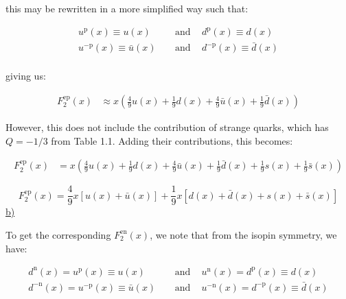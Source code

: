 \documentclass[11pt]{article}
\theoremstyle{definition}
\begin{document}
this may be rewritten in a more simplified way such that:

\begin{align}
    u^{\text{p}}(x) \equiv u(x) \;\;\; &\text{ and }\;\;\; d^{\text{p}}(x) \equiv d(x)\\
    u^{-\text{p}}(x) \equiv \bar{u}(x) \;\;\; &\text{ and }\;\;\; d^{-\text{p}}(x) \equiv \bar{d}(x)\\
\end{align}

giving us:

\begin{align}
    F_{2}^{\text{ep}}(x) %
    &\approx x\left( \frac{4}{9} u(x) + \frac{1}{9}d(x) + \frac{4}{9} \bar{u}(x) + \frac{1}{9} \bar{d}(x)  \right)
\end{align}

However, this does not include the contribution of strange quarks, which has $Q=-1/3$ from Table 1.1. Adding their contributions, this becomes:

\begin{align}
    F_{2}^{\text{ep}}(x) %
    &= x\left( \frac{4}{9} u(x) + \frac{1}{9}d(x) + \frac{4}{9} \bar{u}(x) + \frac{1}{9} \bar{d}(x)
    + \frac{1}{9} s(x)+ \frac{1}{9} \bar{s}(x)  \right)
\end{align}

\begin{equation}\label{part a final}
\boxed{
    F_{2}^{\text{ep}}(x) = 
    \frac{4}{9}x
    \left[
        u(x) + \bar{u}(x)
    \right]
    +
    \frac{1}{9}x
    \left[
        d(x) + \bar{d}(x) + s(x) + \bar{s}(x)
    \right]
}
\end{equation}
\newpage
\underline{b)}

To get the corresponding $F_{2}^{\text{en}}(x)$, we note that from the isopin symmetry, we have:

\begin{align}
    d^{\text{n}}(x) = u^{\text{p}}(x) \equiv u(x) \;\;\; &\text{ and }\;\;\; u^{\text{n}}(x) = d^{\text{p}}(x) \equiv d(x)\\
    d^{-\text{n}}(x) = u^{-\text{p}}(x) \equiv \bar{u}(x) \;\;\; &\text{ and }\;\;\; u^{-\text{n}}(x) = d^{-\text{p}}(x) \equiv \bar{d}(x)\\
\end{align}
\end{document}
